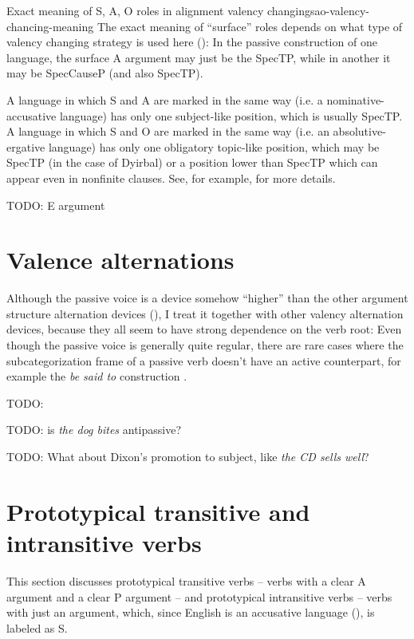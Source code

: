 \documentclass[UTF8, a4paper, oneside, scheme=plain]{ctexrep}
\newcommand*{\citepage}[1]{p.~{#1}}
\newcommand*{\citepages}[1]{pp.~{#1}}
\newcommand{\corpus}[1]{\emph{#1}}
\begin{document}
\begin{theorybox}{Exact meaning of S, A, O roles in alignment valency changing}{sao-valency-chancing-meaning}
    The exact meaning of ``surface'' roles depends on 
    what type of valency changing strategy is used here ():
    In the passive construction of one language, the surface A argument may just be the SpecTP,
    while in another it may be SpecCauseP (and also SpecTP).

    A language in which S and A are marked in the same way (i.e. a nominative-accusative language)
    has only one subject-like position, which is usually SpecTP.
    A language in which S and O are marked in the same way (i.e. an absolutive-ergative language)
    has only one obligatory topic-like position,
    which may be SpecTP (in the case of Dyirbal) 
    or a position lower than SpecTP which can appear even in nonfinite clauses.
    See, for example, \citet{aldridge2008generative} for more details.
\end{theorybox}

TODO: E argument 

\section{Valence alternations}

Although the passive voice is a device 
somehow ``higher'' than the other argument structure alternation devices
(),
I treat it together with other valency alternation devices,
because they all seem to have strong dependence on the verb root: %
Even though the passive voice is generally quite regular,
there are rare cases where the subcategorization frame of a passive verb 
doesn't have an active counterpart,
for example the \corpus{be said to} construction
\citep[\citepage{245}]{dixon2005semantic}.

TODO: \citep[\citepages{249, 1433}]{cgel}

TODO: is \corpus{the dog bites} antipassive?

TODO: What about Dixon's promotion to subject, like \corpus{the CD sells well}?

\section{Prototypical transitive and intransitive verbs}

This section discusses prototypical transitive verbs -- verbs with a clear A argument and a clear P argument --
and prototypical intransitive verbs -- verbs with just an argument,
which, since English is an accusative language (),
is labeled as S.
\end{document}
